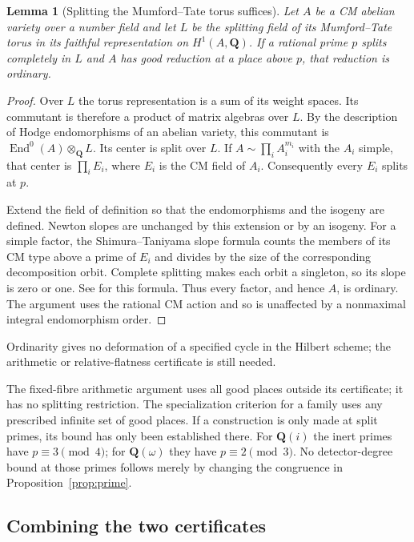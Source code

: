\documentclass[11pt]{article}
\newtheorem{lemma}[theorem]{Lemma}
\theoremstyle{definition}
\theoremstyle{remark}
\newcommand{\Q}{\mathbf Q}
\begin{document}
\begin{lemma}[Splitting the Mumford--Tate torus suffices]
\label{lem:split-ordinary}
Let $A$ be a CM abelian variety over a number field and let $L$
be the splitting field of its Mumford--Tate torus in its
faithful representation on $H^1(A,\Q)$.  If a rational prime
$p$ splits completely in $L$ and $A$ has good reduction at
a place above $p$, that reduction is ordinary.
\end{lemma}
\begin{proof}
Over $L$ the torus representation is a sum of its weight
spaces.  Its commutant is therefore a product of matrix
algebras over $L$.  By the description of Hodge endomorphisms
of an abelian variety, this commutant is
$\operatorname{End}^0(A)\otimes_\Q L$.
Its center is split over $L$.  If
$A\sim\prod_i A_i^{m_i}$ with the $A_i$ simple, that center
is $\prod_i E_i$, where $E_i$ is the CM field of $A_i$.
Consequently every $E_i$ splits at $p$.

Extend the field of definition so that the endomorphisms and
the isogeny are defined.  Newton slopes are unchanged by this
extension or by an isogeny.  For a simple factor, the
Shimura--Taniyama slope formula counts the members of its CM
type above a prime of $E_i$ and divides by the size of the
corresponding decomposition orbit.  Complete splitting makes
each orbit a singleton, so its slope is zero or one.
See \cite[Theorem~2.1, p.~3]{ConradST} for this formula.
Thus every factor, and hence $A$, is ordinary.  The argument
uses the rational CM action and so is unaffected by a
nonmaximal integral endomorphism order.
\end{proof}

Ordinarity gives no deformation of a specified cycle in the
Hilbert scheme; the arithmetic or relative-flatness certificate
is still needed.


The fixed-fibre arithmetic argument uses all good places outside
its certificate; it has no splitting restriction. The
specialization criterion for a family uses any prescribed
infinite set of good places. If a construction is only made
at split primes, its bound has only been established there.
For $\Q(i)$ the inert primes have $p\equiv3\pmod4$; for
$\Q(\omega)$ they have $p\equiv2\pmod3$. No detector-degree
bound at those primes follows merely by changing the congruence
in Proposition~\ref{prop:prime}.

\subsection{Combining the two certificates}
\end{document}
